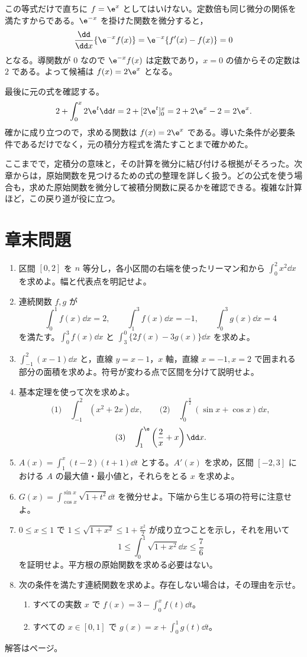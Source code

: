 この等式だけで直ちに $f=\e^x$ としてはいけない。定数倍も同じ微分の関係を満たすからである。$\e^{-x}$ を掛けた関数を微分すると，
\[
 \frac{\dd}{\dd x}\{\e^{-x}f(x)\}
 =\e^{-x}\{f'(x)-f(x)\}=0
\]
となる。導関数が $0$ なので $\e^{-x}f(x)$ は定数であり，$x=0$ の値からその定数は $2$ である。よって候補は $f(x)=2\e^x$ となる。

最後に元の式を確認する。
\[
 2+\int_0^x2\e^t\dd t
 =2+[2\e^t]_0^x=2+2\e^x-2=2\e^x.
\]
確かに成り立つので，求める関数は $f(x)=2\e^x$ である。導いた条件が必要条件であるだけでなく，元の積分方程式を満たすことまで確かめた。

ここまでで，定積分の意味と，その計算を微分に結び付ける根拠がそろった。次章からは，原始関数を見つけるための式の整理を詳しく扱う。どの公式を使う場合も，求めた原始関数を微分して被積分関数に戻るかを確認できる。複雑な計算ほど，この戻り道が役に立つ。

\section*{章末問題}
\begin{enumerate}[label=\textbf{\thechapter.\arabic*},leftmargin=*]
 \item\label{問:定積分リーマン和} 区間 $[0,2]$ を $n$ 等分し，各小区間の右端を使ったリーマン和から $\int_0^2x^2\dd x$ を求めよ。幅と代表点を明記せよ。
 \item\label{問:定積分性質} 連続関数 $f,g$ が
 \[
  \int_0^1f(x)\dd x=2,\qquad
  \int_1^3f(x)\dd x=-1,\qquad
  \int_0^3g(x)\dd x=4
 \]
 を満たす。$\int_0^3f(x)\dd x$ と $\int_3^0\{2f(x)-3g(x)\}\dd x$ を求めよ。
 \item\label{問:定積分と面積} $\int_{-1}^2(x-1)\dd x$ と，直線 $y=x-1$，$x$ 軸，直線 $x=-1,x=2$ で囲まれる部分の面積を求めよ。符号が変わる点で区間を分けて説明せよ。
 \item\label{問:基本定理計算} 基本定理を使って次を求めよ。
 \[
  \text{(1)}\quad\int_{-1}^2(x^2+2x)\dd x,\qquad
  \text{(2)}\quad\int_0^{\frac\pi2}(\sin x+\cos x)\dd x,
 \]
 \[
  \text{(3)}\quad\int_1^{\e}\left(\frac2x+x\right)\dd x.
 \]
 \item\label{問:面積関数増減} $A(x)=\int_1^x(t-2)(t+1)\dd t$ とする。$A'(x)$ を求め，区間 $[-2,3]$ における $A$ の最大値・最小値と，それらをとる $x$ を求めよ。
 \item\label{問:変数上下端} $G(x)=\int_{\cos x}^{\sin x}\sqrt{1+t^2}\dd t$ を微分せよ。下端から生じる項の符号に注意せよ。
 \item\label{問:積分の評価} $0\le x\le1$ で $1\le\sqrt{1+x^2}\le1+\frac{x^2}{2}$ が成り立つことを示し，それを用いて
 \[
  1\le\int_0^1\sqrt{1+x^2}\dd x\le\frac76
 \]
 を証明せよ。平方根の原始関数を求める必要はない。
 \item\label{問:積分方程式基本} 次の条件を満たす連続関数を求めよ。存在しない場合は，その理由を示せ。
 \begin{enumerate}[label=(\arabic*),leftmargin=*]
  \item すべての実数 $x$ で $f(x)=3-\int_0^x f(t)\dd t$。
  \item すべての $x\in[0,1]$ で $g(x)=x+\int_0^1g(t)\dd t$。
 \end{enumerate}
\end{enumerate}

\smallskip\noindent 解答は\pageref{解答:第3章}ページ。
